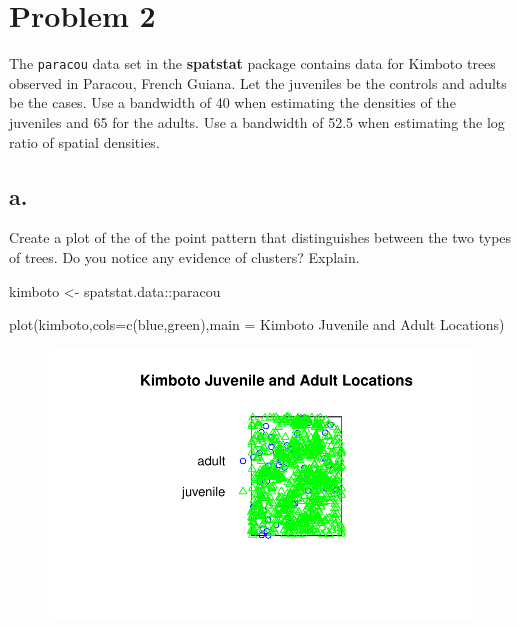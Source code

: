 \documentclass[
  letterpaper,
  DIV=11,
  numbers=noendperiod]{scrartcl}
\newenvironment{Shaded}{\begin{snugshade}}{\end{snugshade}}
\newcommand{\AttributeTok}[1]{\textcolor[rgb]{0.40,0.45,0.13}{#1}}
\newcommand{\FunctionTok}[1]{\textcolor[rgb]{0.28,0.35,0.67}{#1}}
\newcommand{\NormalTok}[1]{\textcolor[rgb]{0.00,0.23,0.31}{#1}}
\newcommand{\OtherTok}[1]{\textcolor[rgb]{0.00,0.23,0.31}{#1}}
\newcommand{\SpecialCharTok}[1]{\textcolor[rgb]{0.37,0.37,0.37}{#1}}
\newcommand{\StringTok}[1]{\textcolor[rgb]{0.13,0.47,0.30}{#1}}
\begin{document}
\hypertarget{problem-2}{%
\section{Problem 2}\label{problem-2}}

The \texttt{paracou} data set in the \textbf{spatstat} package contains
data for Kimboto trees observed in Paracou, French Guiana. Let the
juveniles be the controls and adults be the cases. Use a bandwidth of 40
when estimating the densities of the juveniles and 65 for the adults.
Use a bandwidth of 52.5 when estimating the log ratio of spatial
densities.

\hypertarget{a.-1}{%
\subsection{a.}\label{a.-1}}

Create a plot of the of the point pattern that distinguishes between the
two types of trees. Do you notice any evidence of clusters? Explain.

\begin{Shaded}
\begin{Highlighting}[]
\NormalTok{kimboto }\OtherTok{\textless{}{-}}\NormalTok{ spatstat.data}\SpecialCharTok{::}\NormalTok{paracou}

\FunctionTok{plot}\NormalTok{(kimboto,}\AttributeTok{cols=}\FunctionTok{c}\NormalTok{(}\StringTok{\textquotesingle{}blue\textquotesingle{}}\NormalTok{,}\StringTok{\textquotesingle{}green\textquotesingle{}}\NormalTok{),}\AttributeTok{main =} \StringTok{\textquotesingle{}Kimboto Juvenile and Adult Locations\textquotesingle{}}\NormalTok{)}
\end{Highlighting}
\end{Shaded}

\begin{figure}[H]

{\centering \includegraphics{cc-r-kd-hw_files/figure-pdf/unnamed-chunk-9-1.pdf}

}

\end{figure}
\end{document}
